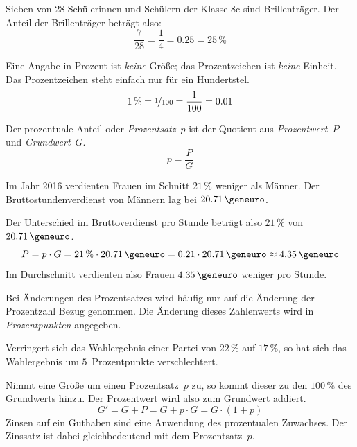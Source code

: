 \begin{bsp}[Anteil]
 Sieben von 28 Schülerinnen und Schülern der Klasse 8c sind Brillenträger. Der Anteil der Brillenträger beträgt also:
 \begin{equation*}
  \frac{7}{28} = \frac{1}{4} = 0.25 = 25\,\%
 \end{equation*}
\end{bsp}

\begin{beme}[Prozentangaben]
 Eine Angabe in Prozent ist \emph{keine} Größe; das Prozentzeichen ist \emph{keine} Einheit. Das Prozentzeichen steht einfach nur für ein Hundertstel.
 \begin{equation*}
  1\,\% = \nicefrac{1}{100} = \frac{1}{100} = 0.01
 \end{equation*}
 
 Der prozentuale Anteil oder \emph{Prozentsatz}~\(p\) ist der Quotient aus \emph{Prozentwert}~\(P\) und \emph{Grundwert}~\(G\).
 \begin{equation*}
  p = \frac{P}{G}
 \end{equation*}

\end{beme}

\begin{bsp}[Prozentangabe]
Im Jahr 2016 verdienten Frauen im Schnitt \(21\,\%\) weniger als Männer. Der Bruttostundenverdienst von Männern lag bei \(20.71\,\geneuro\).
 
 Der Unterschied im Bruttoverdienst pro Stunde beträgt also \(21\,\%\) von \(20.71\,\geneuro\).
 \begin{equation*}
  P = p \cdot G = 21\,\% \cdot 20.71\,\geneuro = 0.21\cdot 20.71\,\geneuro \approx 4.35\,\geneuro 
 \end{equation*}
 Im Durchschnitt verdienten also Frauen \(4.35\,\geneuro\) weniger pro Stunde.
\end{bsp}

\begin{defi}[Prozentpunkte]
 Bei Änderungen des Prozentsatzes wird häufig nur auf die Änderung der Prozentzahl Bezug genommen. Die Änderung dieses Zahlenwerts wird in \emph{Prozentpunkten} angegeben.
 
 Verringert sich das Wahlergebnis einer Partei von \(22\,\%\) auf \(17\,\%\), so hat sich das Wahlergebnis um \(5\)~Prozentpunkte verschlechtert.
\end{defi}


\begin{regel}
 Nimmt eine Größe um einen Prozentsatz~\(p\) zu, so kommt dieser zu den \(100\,\%\) des Grundwerts hinzu. Der Prozentwert wird also zum Grundwert addiert.
 \begin{equation*}
  G' = G + P = G + p\cdot G = G\cdot (1+p)
 \end{equation*}
 Zinsen auf ein Guthaben sind eine Anwendung des prozentualen Zuwachses. Der Zinssatz ist dabei gleichbedeutend mit dem Prozentsatz~\(p\).
 \end{regel}
 
